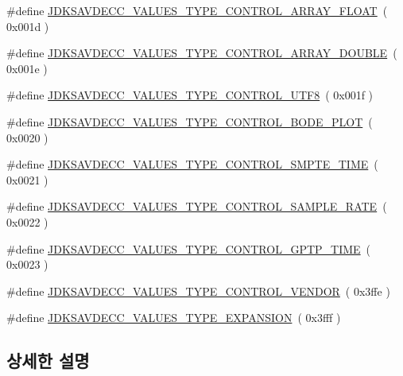 \begin{DoxyCompactItemize}
\item 
\#define \hyperlink{group__values__type_gafd7a306a4d0b1c8626b2c6f29150548b}{J\+D\+K\+S\+A\+V\+D\+E\+C\+C\+\_\+\+V\+A\+L\+U\+E\+S\+\_\+\+T\+Y\+P\+E\+\_\+\+C\+O\+N\+T\+R\+O\+L\+\_\+\+A\+R\+R\+A\+Y\+\_\+\+F\+L\+O\+AT}~( 0x001d )
\item 
\#define \hyperlink{group__values__type_ga4508b1033850457e784123a95aa17ca7}{J\+D\+K\+S\+A\+V\+D\+E\+C\+C\+\_\+\+V\+A\+L\+U\+E\+S\+\_\+\+T\+Y\+P\+E\+\_\+\+C\+O\+N\+T\+R\+O\+L\+\_\+\+A\+R\+R\+A\+Y\+\_\+\+D\+O\+U\+B\+LE}~( 0x001e )
\item 
\#define \hyperlink{group__values__type_ga735bceb0182803398a0b08b3bc99be07}{J\+D\+K\+S\+A\+V\+D\+E\+C\+C\+\_\+\+V\+A\+L\+U\+E\+S\+\_\+\+T\+Y\+P\+E\+\_\+\+C\+O\+N\+T\+R\+O\+L\+\_\+\+U\+T\+F8}~( 0x001f )
\item 
\#define \hyperlink{group__values__type_ga529816de4b4dcbb898e5b58f9b0a3d65}{J\+D\+K\+S\+A\+V\+D\+E\+C\+C\+\_\+\+V\+A\+L\+U\+E\+S\+\_\+\+T\+Y\+P\+E\+\_\+\+C\+O\+N\+T\+R\+O\+L\+\_\+\+B\+O\+D\+E\+\_\+\+P\+L\+OT}~( 0x0020 )
\item 
\#define \hyperlink{group__values__type_ga3e5e7380d5901916fbbc8f975e03dcdc}{J\+D\+K\+S\+A\+V\+D\+E\+C\+C\+\_\+\+V\+A\+L\+U\+E\+S\+\_\+\+T\+Y\+P\+E\+\_\+\+C\+O\+N\+T\+R\+O\+L\+\_\+\+S\+M\+P\+T\+E\+\_\+\+T\+I\+ME}~( 0x0021 )
\item 
\#define \hyperlink{group__values__type_ga356afbfa78f655174e7adb5b4bde22ca}{J\+D\+K\+S\+A\+V\+D\+E\+C\+C\+\_\+\+V\+A\+L\+U\+E\+S\+\_\+\+T\+Y\+P\+E\+\_\+\+C\+O\+N\+T\+R\+O\+L\+\_\+\+S\+A\+M\+P\+L\+E\+\_\+\+R\+A\+TE}~( 0x0022 )
\item 
\#define \hyperlink{group__values__type_ga631c27ba1c9f80e29ee6a95d04839cf3}{J\+D\+K\+S\+A\+V\+D\+E\+C\+C\+\_\+\+V\+A\+L\+U\+E\+S\+\_\+\+T\+Y\+P\+E\+\_\+\+C\+O\+N\+T\+R\+O\+L\+\_\+\+G\+P\+T\+P\+\_\+\+T\+I\+ME}~( 0x0023 )
\item 
\#define \hyperlink{group__values__type_gabbd6cfec581948b2098661821d34276d}{J\+D\+K\+S\+A\+V\+D\+E\+C\+C\+\_\+\+V\+A\+L\+U\+E\+S\+\_\+\+T\+Y\+P\+E\+\_\+\+C\+O\+N\+T\+R\+O\+L\+\_\+\+V\+E\+N\+D\+OR}~( 0x3ffe )
\item 
\#define \hyperlink{group__values__type_gaaa62b6d78ac2a75b04e11eeeecf05996}{J\+D\+K\+S\+A\+V\+D\+E\+C\+C\+\_\+\+V\+A\+L\+U\+E\+S\+\_\+\+T\+Y\+P\+E\+\_\+\+E\+X\+P\+A\+N\+S\+I\+ON}~( 0x3fff )
\end{DoxyCompactItemize}


\subsection{상세한 설명}


